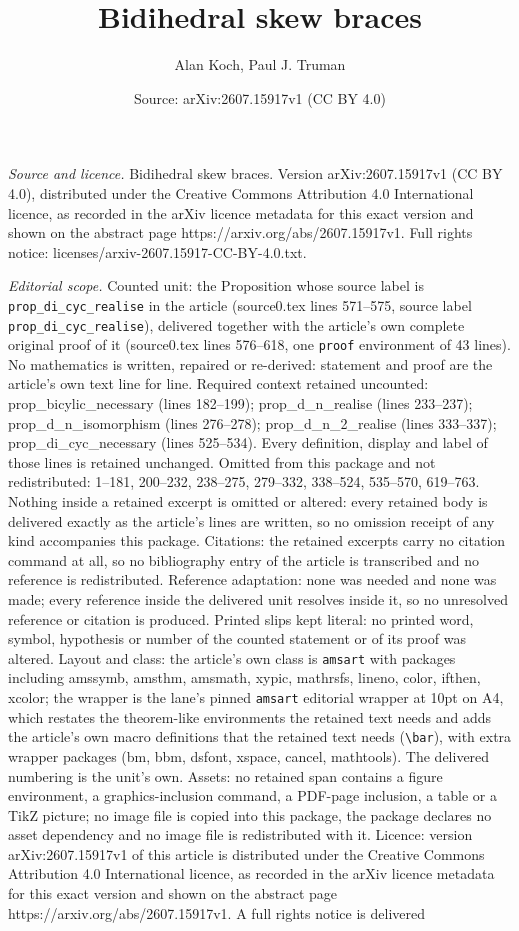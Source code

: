 \documentclass[10pt,a4paper]{amsart}
\title[Bidihedral skew braces]{Bidihedral skew braces}
\author{Alan Koch, Paul J. Truman}
\date{Source: arXiv:2607.15917v1 (CC BY 4.0)}
\begin{document}
\maketitle

\noindent\emph{Source and licence.} Bidihedral skew braces. Version arXiv:2607.15917v1 (CC BY 4.0), distributed under the Creative Commons Attribution 4.0 International licence, as recorded in the arXiv licence metadata for this exact version and shown on the abstract page https://arxiv.org/abs/2607.15917v1. Full rights notice: licenses/arxiv-2607.15917-CC-BY-4.0.txt.\par\smallskip

\noindent\textit{Editorial scope.} Counted unit: the Proposition whose source label is \texttt{prop\_di\_cyc\_realise} in the article (source0.tex lines 571--575, source label \texttt{prop\_di\_cyc\_realise}), delivered together with the article's own complete original proof of it (source0.tex lines 576--618, one \texttt{proof} environment of 43 lines). No mathematics is written, repaired or re-derived: statement and proof are the article's own text line for line. Required context retained uncounted: prop\_bicylic\_necessary (lines 182--199); prop\_d\_n\_realise (lines 233--237); prop\_d\_n\_isomorphism (lines 276--278); prop\_d\_n\_2\_realise (lines 333--337); prop\_di\_cyc\_necessary (lines 525--534). Every definition, display and label of those lines is retained unchanged. Omitted from this package and not redistributed: 1--181, 200--232, 238--275, 279--332, 338--524, 535--570, 619--763. Nothing inside a retained excerpt is omitted or altered: every retained body is delivered exactly as the article's lines are written, so no omission receipt of any kind accompanies this package. Citations: the retained excerpts carry no citation command at all, so no bibliography entry of the article is transcribed and no reference is redistributed. Reference adaptation: none was needed and none was made; every reference inside the delivered unit resolves inside it, so no unresolved reference or citation is produced. Printed slips kept literal: no printed word, symbol, hypothesis or number of the counted statement or of its proof was altered. Layout and class: the article's own class is \texttt{amsart} with packages including amssymb, amsthm, amsmath, xypic, mathrsfs, lineno, color, ifthen, xcolor; the wrapper is the lane's pinned \texttt{amsart} editorial wrapper at 10pt on A4, which restates the theorem-like environments the retained text needs and adds the article's own macro definitions that the retained text needs (\texttt{\textbackslash bar}), with extra wrapper packages (bm, bbm, dsfont, xspace, cancel, mathtools). The delivered numbering is the unit's own. Assets: no retained span contains a figure environment, a graphics-inclusion command, a PDF-page inclusion, a table or a TikZ picture; no image file is copied into this package, the package declares no asset dependency and no image file is redistributed with it. Licence: version arXiv:2607.15917v1 of this article is distributed under the Creative Commons Attribution 4.0 International licence, as recorded in the arXiv licence metadata for this exact version and shown on the abstract page https://arxiv.org/abs/2607.15917v1. A full rights notice is delivered 
\end{document}
